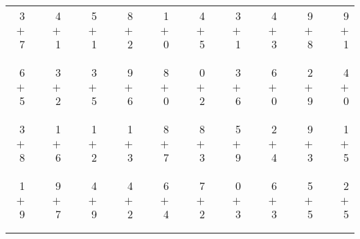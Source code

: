 \documentclass[12pt, letterpaper]{article}
\begin{document}
\begin{tabular}{rrrrrrrrrrrrrrrrrrr}
3 & & 4 & & 5 & & 8 & & 1 & & 4 & & 3 & & 4 & & 9 & & 9\\
$+$ 7 & & $+$ 1 & & $+$ 1 & & $+$ 2 & & $+$ 0 & & $+$ 5 & & $+$ 1 & & $+$ 3 & & $+$ 8 & & $+$ 1\\
\cline{1-1} \cline{3-3} \cline{5-5} \cline{7-7} \cline{9-9} \cline{11-11} \cline{13-13} \cline{15-15} \cline{17-17} \cline{19-19} \\ \\
6 & & 3 & & 3 & & 9 & & 8 & & 0 & & 3 & & 6 & & 2 & & 4\\
$+$ 5 & & $+$ 2 & & $+$ 5 & & $+$ 6 & & $+$ 0 & & $+$ 2 & & $+$ 6 & & $+$ 0 & & $+$ 9 & & $+$ 0\\
\cline{1-1} \cline{3-3} \cline{5-5} \cline{7-7} \cline{9-9} \cline{11-11} \cline{13-13} \cline{15-15} \cline{17-17} \cline{19-19} \\ \\
3 & & 1 & & 1 & & 1 & & 8 & & 8 & & 5 & & 2 & & 9 & & 1\\
$+$ 8 & & $+$ 6 & & $+$ 2 & & $+$ 3 & & $+$ 7 & & $+$ 3 & & $+$ 9 & & $+$ 4 & & $+$ 3 & & $+$ 5\\
\cline{1-1} \cline{3-3} \cline{5-5} \cline{7-7} \cline{9-9} \cline{11-11} \cline{13-13} \cline{15-15} \cline{17-17} \cline{19-19} \\ \\
1 & & 9 & & 4 & & 4 & & 6 & & 7 & & 0 & & 6 & & 5 & & 2\\
$+$ 9 & & $+$ 7 & & $+$ 9 & & $+$ 2 & & $+$ 4 & & $+$ 2 & & $+$ 3 & & $+$ 3 & & $+$ 5 & & $+$ 5\\
\cline{1-1} \cline{3-3} \cline{5-5} \cline{7-7} \cline{9-9} \cline{11-11} \cline{13-13} \cline{15-15} \cline{17-17} \cline{19-19} \\ \\
\end{tabular}
\newpage
\end{document}
